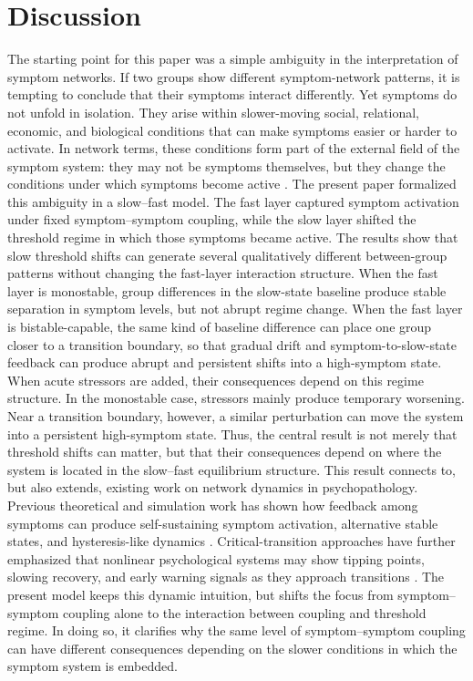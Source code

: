 \documentclass[man,12pt,floatsintext]{apa7}
\begin{document}
\section{Discussion}
The starting point for this paper was a simple ambiguity in the interpretation of symptom networks. If two groups show different symptom-network patterns, it is tempting to conclude that their symptoms interact differently. Yet symptoms do not unfold in isolation. They arise within slower-moving social, relational, economic, and biological conditions that can make symptoms easier or harder to activate. In network terms, these conditions form part of the external field of the symptom system: they may not be symptoms themselves, but they change the conditions under which symptoms become active \parencite{borsboom2017network}. The present paper formalized this ambiguity in a slow--fast model. The fast layer captured symptom activation under fixed symptom--symptom coupling, while the slow layer shifted the threshold regime in which those symptoms became active.
The results show that slow threshold shifts can generate several qualitatively different between-group patterns without changing the fast-layer interaction structure. When the fast layer is monostable, group differences in the slow-state baseline produce stable separation in symptom levels, but not abrupt regime change. When the fast layer is bistable-capable, the same kind of baseline difference can place one group closer to a transition boundary, so that gradual drift and symptom-to-slow-state feedback can produce abrupt and persistent shifts into a high-symptom state. When acute stressors are added, their consequences depend on this regime structure. In the monostable case, stressors mainly produce temporary worsening. Near a transition boundary, however, a similar perturbation can move the system into a persistent high-symptom state. Thus, the central result is not merely that threshold shifts can matter, but that their consequences depend on where the system is located in the slow--fast equilibrium structure.
This result connects to, but also extends, existing work on network dynamics in psychopathology. Previous theoretical and simulation work has shown how feedback among symptoms can produce self-sustaining symptom activation, alternative stable states, and hysteresis-like dynamics \parencite{borsboom2017network, cramer2016major, van2014critical}. Critical-transition approaches have further emphasized that nonlinear psychological systems may show tipping points, slowing recovery, and early warning signals as they approach transitions \parencite{scheffer2009early, van2014critical, helmich2021early}. The present model keeps this dynamic intuition, but shifts the focus from symptom--symptom coupling alone to the interaction between coupling and threshold regime. In doing so, it clarifies why the same level of symptom--symptom coupling can have different consequences depending on the slower conditions in which the symptom system is embedded.
\end{document}
